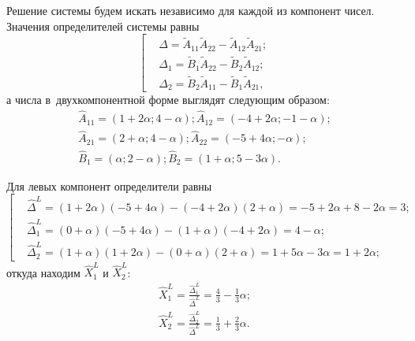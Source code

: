 Решение системы будем искать независимо для каждой из компонент чисел. Значения определителей системы равны
\begin{equation*}
  \left[ \begin{aligned}
    & \Delta = \tilde A_{11} \tilde A_{22}-\tilde A_{12} \tilde A_{21}; \\
    & \Delta_1 = \tilde B_1 \tilde A_{22}-\tilde B_2 \tilde A_{12}; \\
    & \Delta_2 = \tilde B_2 \tilde A_{11}-\tilde B_1 \tilde A_{21},
    \end{aligned} \right.
\end{equation*}
а числа в~двухкомпонентной форме выглядят следующим образом:
\begin{gather*}
  \hat A_{11} = \left(1+2\alpha; 4-\alpha \right); \hat A_{12} = \left(-4+2\alpha; -1-\alpha \right); \\
  \hat A_{21} = \left(2+\alpha; 4-\alpha \right); \hat A_{22} = \left(-5+4\alpha; -\alpha \right); \\
  \hat B_1 = \left(\alpha; 2-\alpha \right); \hat B_2 = \left(1+\alpha; 5-3\alpha \right).
\end{gather*}

Для левых компонент определители равны
\begin{equation*}
  \left[ \begin{aligned}
    & \hat \Delta^L = \left(1+2\alpha \right) \left(-5+4\alpha \right) - \left(-4+2\alpha \right) \left(2+\alpha \right) = -5+2\alpha+8-2\alpha = 3; \\
    & \hat \Delta_1^L = \left(0 + \alpha \right) \left( -5 + 4\alpha \right) - \left(1+\alpha \right) \left(-4+2\alpha \right) = 4-\alpha; \\
    & \hat \Delta_2^L = \left(1+\alpha \right) \left(1+2\alpha \right) - \left(0+\alpha \right) \left(2+\alpha \right) = 1+5\alpha-3\alpha =1+2\alpha;
  \end{aligned} \right.
\end{equation*}
откуда находим $\hat X_1^L$ и $\hat X_2^L$:
\begin{gather*}
  \hat X_1^L = \frac{\hat \Delta_1^L}{\hat \Delta^L} = \frac{4}{3} - \frac{1}{3}\alpha; \\
  \hat X_2^L = \frac{\hat \Delta_2^L}{\hat \Delta^L} = \frac{1}{3} + \frac{2}{3}\alpha.
\end{gather*}

